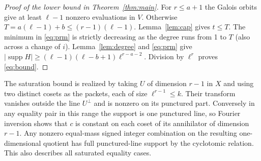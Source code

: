 \documentclass[11pt]{article}
\theoremstyle{remark}\newtheorem{remark}[theorem]{Remark}
\newcommand{\supp}{\operatorname{supp}}
\begin{document}
\begin{proof}[Proof of the lower bound in Theorem~\ref{thm:main}]
For $r\le a+1$ the Galois orbits give at least $\ell-1$ nonzero evaluations in $V$. Otherwise $T=a(\ell-1)+b\le(r-1)(\ell-1)$. Lemma~\ref{lem:cap} gives $t\le T$. The minimum in \eqref{eq:prm} is strictly decreasing as the degree runs from 1 to $T$ (also across a change of $i$). Lemma~\ref{lem:degree} and \eqref{eq:prm} give $|\supp H|\ge(\ell-1)(\ell-b+1)\ell^{r-a-2}$. Division by $\ell^r$ proves \eqref{eq:bound}.
\end{proof}

The saturation bound is realized by taking $U$ of dimension $r-1$ in $X$ and using two distinct cosets as the packets, each of size $\ell^{r-1}\le k$. Their transform vanishes outside the line $U^\perp$ and is nonzero on its punctured part. Conversely in any equality pair in this range the support is one punctured line, so Fourier inversion shows that $c$ is constant on each coset of its annihilator of dimension $r-1$. Any nonzero equal-mass signed integer combination on the resulting one-dimensional quotient has full punctured-line support by the cyclotomic relation. This also describes all saturated equality cases.
\end{document}

